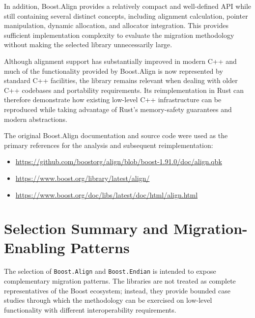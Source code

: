 In addition, Boost.Align provides a relatively compact and well-defined API while still containing several distinct concepts, 
including alignment calculation, pointer manipulation, dynamic allocation, and allocator integration. 
This provides sufficient implementation complexity to evaluate the migration methodology without making the selected library unnecessarily large.

Although alignment support has substantially improved in modern C++ and much of the functionality 
provided by Boost.Align is now represented by standard C++ facilities, 
the library remains relevant when dealing with older C++ codebases and portability requirements. 
Its reimplementation in Rust can therefore demonstrate how existing low-level C++ infrastructure can be reproduced 
while taking advantage of Rust's memory-safety guarantees and modern abstractions.

The original Boost.Align documentation and source code were used as the primary references for the analysis and subsequent reimplementation:

\begin{itemize}
\item \url{https://github.com/boostorg/align/blob/boost-1.91.0/doc/align.qbk}
\item \url{https://www.boost.org/library/latest/align/}
\item \url{https://www.boost.org/doc/libs/latest/doc/html/align.html}
\end{itemize}

\section{Selection Summary and Migration-Enabling Patterns}
\label{sec:selected_libraries_summary}

The selection of \texttt{Boost.Align} and \texttt{Boost.Endian} is intended to expose complementary migration patterns. The libraries are not treated as complete representatives of the Boost ecosystem; instead, they provide bounded case studies through which the methodology can be exercised on low-level functionality with different interoperability requirements.

